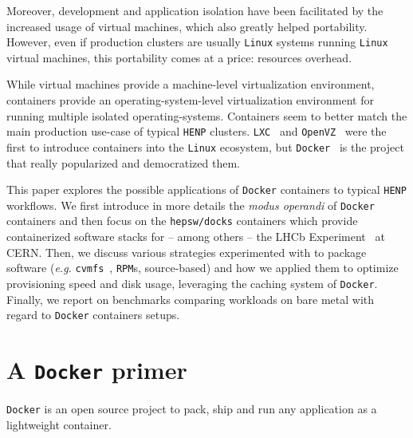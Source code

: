 \documentclass[a4paper]{jpconf}
\begin{document}
Moreover, development and application isolation have been facilitated by the
increased usage of virtual machines, which also greatly helped portability.
However, even if production clusters are usually \texttt{Linux} systems running
\texttt{Linux} virtual machines, this portability comes at a price: resources overhead.

While virtual machines provide a machine-level virtualization environment,
containers provide an operating-system-level virtualization environment for
running multiple isolated operating-systems.
Containers seem to better match the main production use-case of typical
\texttt{HENP} clusters.
\texttt{LXC}~\cite{ref-lxc} and \texttt{OpenVZ}~\cite{ref-openvz} were the first to introduce containers into the
\texttt{Linux} ecosystem, but \texttt{Docker}~\cite{ref-docker} is the project that
really popularized and democratized them.

This paper explores the possible applications of \texttt{Docker} containers to
typical \texttt{HENP} workflows.
We first introduce in more details the \emph{modus operandi} of \texttt{Docker}
containers and then focus on the \texttt{hepsw/docks} containers which provide
containerized software stacks for -- among others -- the LHCb
Experiment~\cite{ref-lhcb} at CERN.
Then, we discuss various strategies experimented with to package software
(\emph{e.g.} \texttt{cvmfs}~\cite{ref-cvmfs}, \texttt{RPM}s, source-based) and how we applied
them to optimize provisioning speed and disk usage, leveraging the caching system of \texttt{Docker}.
Finally, we report on benchmarks comparing workloads on bare metal with regard
to \texttt{Docker} containers setups.

\section{A \texttt{Docker} primer}

\texttt{Docker} is an open source project to pack, ship and run any application
as a lightweight container.
 
 
\end{document}
